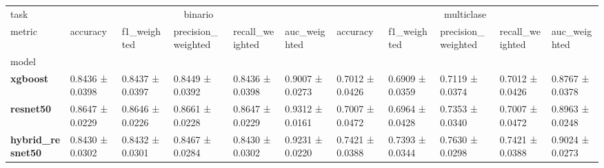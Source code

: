 \begin{tabular}{lllllllllll}
\toprule
task & \multicolumn{5}{c}{binario} & \multicolumn{5}{c}{multiclase} \\
metric & accuracy & f1_weighted & precision_weighted & recall_weighted & auc_weighted & accuracy & f1_weighted & precision_weighted & recall_weighted & auc_weighted \\
model &  &  &  &  &  &  &  &  &  &  \\
\midrule
\textbf{xgboost} & 0.8436 ± 0.0398 & 0.8437 ± 0.0397 & 0.8449 ± 0.0392 & 0.8436 ± 0.0398 & 0.9007 ± 0.0273 & 0.7012 ± 0.0426 & 0.6909 ± 0.0359 & 0.7119 ± 0.0374 & 0.7012 ± 0.0426 & 0.8767 ± 0.0378 \\
\textbf{resnet50} & 0.8647 ± 0.0229 & 0.8646 ± 0.0226 & 0.8661 ± 0.0228 & 0.8647 ± 0.0229 & 0.9312 ± 0.0161 & 0.7007 ± 0.0472 & 0.6964 ± 0.0428 & 0.7353 ± 0.0340 & 0.7007 ± 0.0472 & 0.8963 ± 0.0248 \\
\textbf{hybrid_resnet50} & 0.8430 ± 0.0302 & 0.8432 ± 0.0301 & 0.8467 ± 0.0284 & 0.8430 ± 0.0302 & 0.9231 ± 0.0220 & 0.7421 ± 0.0388 & 0.7393 ± 0.0344 & 0.7630 ± 0.0298 & 0.7421 ± 0.0388 & 0.9024 ± 0.0273 \\
\bottomrule
\end{tabular}
